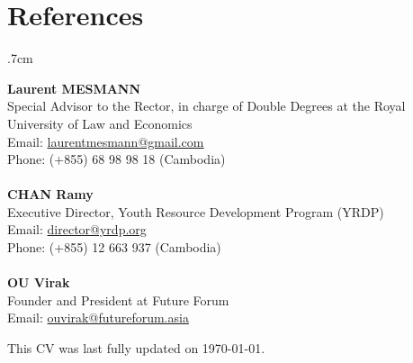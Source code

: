 \documentclass[10pt,a4paper]{article}
\begin{document}
\section*{References}	
		\vspace{-0em}
		\begin{adjustwidth}{.7cm}{}
	
			\textbf{Laurent MESMANN}\\
			Special Advisor to the Rector, in charge of Double Degrees at the Royal University of Law and Economics\\
			Email: \href{mailto: laurentmesmann@gmail.com}{laurentmesmann@gmail.com}\\
			Phone: (+855) 68 98 98 18 (Cambodia)\\\\
			\textbf {CHAN Ramy}\\
			Executive Director, Youth Resource Development Program (YRDP) \\
			Email: \href{mailto: director@yrdp.org}{director@yrdp.org}\\
			Phone: (+855) 12 663 937 (Cambodia)\\\\
			\textbf{OU Virak}\\
			Founder and President at Future Forum\\
			Email: \href{mailto: ouvirak@futureforum.asia }{ouvirak@futureforum.asia}
						
		\end{adjustwidth}					
		\vspace{2em}
	
	\flushright This CV was last fully updated on \today. 
						
\end{document}
